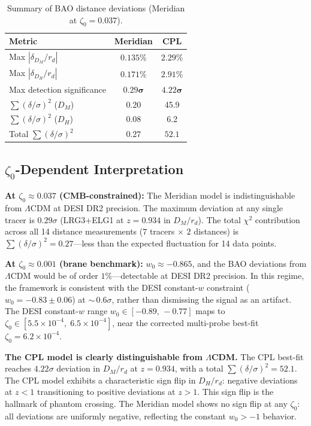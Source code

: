 \begin{table}[htbp]
\centering
\caption{Summary of BAO distance deviations (Meridian at $\zeta_0 = 0.037$).}
\label{tab:2-BAO-summary}
\begin{tabular}{lcc}
\toprule
Metric & Meridian & CPL \\
\midrule
Max $|\delta_{D_M}/r_d|$ & $0.135\%$ & $2.29\%$ \\
Max $|\delta_{D_H}/r_d|$ & $0.171\%$ & $2.91\%$ \\
Max detection significance & $\mathbf{0.29\sigma}$ & $\mathbf{4.22\sigma}$ \\
$\sum(\delta/\sigma)^2$ ($D_M$) & 0.20 & 45.9 \\
$\sum(\delta/\sigma)^2$ ($D_H$) & 0.08 & 6.2 \\
Total $\sum(\delta/\sigma)^2$ & $\mathbf{0.27}$ & $\mathbf{52.1}$ \\
\bottomrule
\end{tabular}
\end{table}

\subsection{$\zeta_0$-Dependent Interpretation}
\label{sec:2-DESI-interp}

\textbf{At $\zeta_0 \approx 0.037$ (CMB-constrained):} The Meridian model is indistinguishable from $\Lambda$CDM at DESI DR2 precision. The maximum deviation at any single tracer is $0.29\sigma$ (LRG3+ELG1 at $z = 0.934$ in $D_M/r_d$). The total $\chi^2$ contribution across all 14 distance measurements ($7$ tracers $\times$ $2$ distances) is $\sum(\delta/\sigma)^2 = 0.27$---less than the expected fluctuation for 14 data points.

\textbf{At $\zeta_0 \approx 0.001$ (brane benchmark):} $w_0 \approx -0.865$, and the BAO deviations from $\Lambda$CDM would be of order $1\%$---detectable at DESI DR2 precision. In this regime, the framework is consistent with the DESI constant-$w$ constraint ($w_0 = -0.83 \pm 0.06$) at ${\sim}\,0.6\sigma$, rather than dismissing the signal as an artifact. The DESI constant-$w$ range $w_0 \in [-0.89,\, -0.77]$ maps to $\zeta_0 \in [5.5 \times 10^{-4},\; 6.5 \times 10^{-4}]$, near the corrected multi-probe best-fit $\zeta_0 = 6.2 \times 10^{-4}$.

\textbf{The CPL model is clearly distinguishable from $\Lambda$CDM.} The CPL best-fit reaches $4.22\sigma$ deviation in $D_M/r_d$ at $z = 0.934$, with a total $\sum(\delta/\sigma)^2 = 52.1$. The CPL model exhibits a characteristic sign flip in $D_H/r_d$: negative deviations at $z < 1$ transitioning to positive deviations at $z > 1$. This sign flip is the hallmark of phantom crossing. The Meridian model shows no sign flip at any $\zeta_0$: all deviations are uniformly negative, reflecting the constant $w_0 > -1$ behavior.

